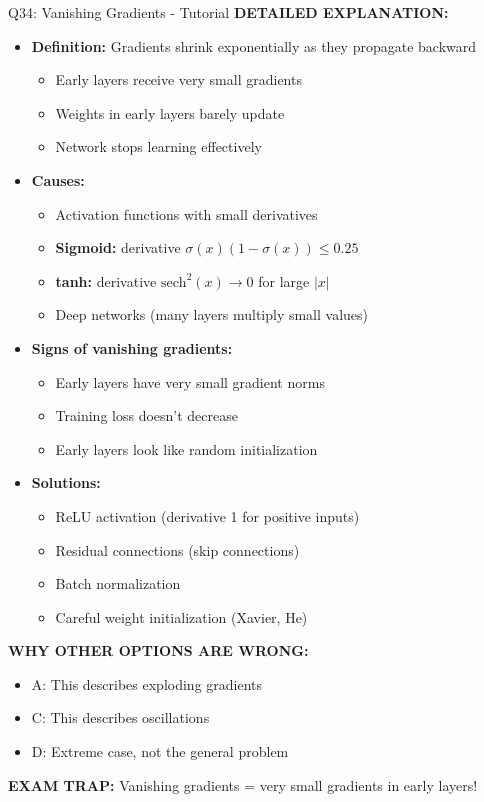 \documentclass[8pt]{beamer}
\begin{document}
\begin{frame}{Q34: Vanishing Gradients - Tutorial}
		\vspace{0.05cm}
		\textbf{DETAILED EXPLANATION:}
		\begin{itemize}
			\item \textbf{Definition:} Gradients shrink exponentially as they propagate backward
			\begin{itemize}
				\item Early layers receive very small gradients
				\item Weights in early layers barely update
				\item Network stops learning effectively
			\end{itemize}
			\item \textbf{Causes:}
			\begin{itemize}
				\item Activation functions with small derivatives
				\item \textbf{Sigmoid:} derivative $\sigma(x)(1-\sigma(x)) \leq 0.25$
				\item \textbf{tanh:} derivative $\text{sech}^2(x) \to 0$ for large $|x|$
				\item Deep networks (many layers multiply small values)
			\end{itemize}
			\item \textbf{Signs of vanishing gradients:}
			\begin{itemize}
				\item Early layers have very small gradient norms
				\item Training loss doesn't decrease
				\item Early layers look like random initialization
			\end{itemize}
			\item \textbf{Solutions:}
			\begin{itemize}
				\item ReLU activation (derivative 1 for positive inputs)
				\item Residual connections (skip connections)
				\item Batch normalization
				\item Careful weight initialization (Xavier, He)
			\end{itemize}
		\end{itemize}
		
		\vspace{0.05cm}
		\textcolor{myred}{\textbf{WHY OTHER OPTIONS ARE WRONG:}}
		\begin{itemize}
			\item \textcolor{myred}{A:} This describes exploding gradients
			\item \textcolor{myred}{C:} This describes oscillations
			\item \textcolor{myred}{D:} Extreme case, not the general problem
		\end{itemize}
		
		\textcolor{myred}{\textbf{EXAM TRAP:}} Vanishing gradients = \textcolor{myblue}{very small gradients} in early layers!
	\end{frame}
	
\end{document}
